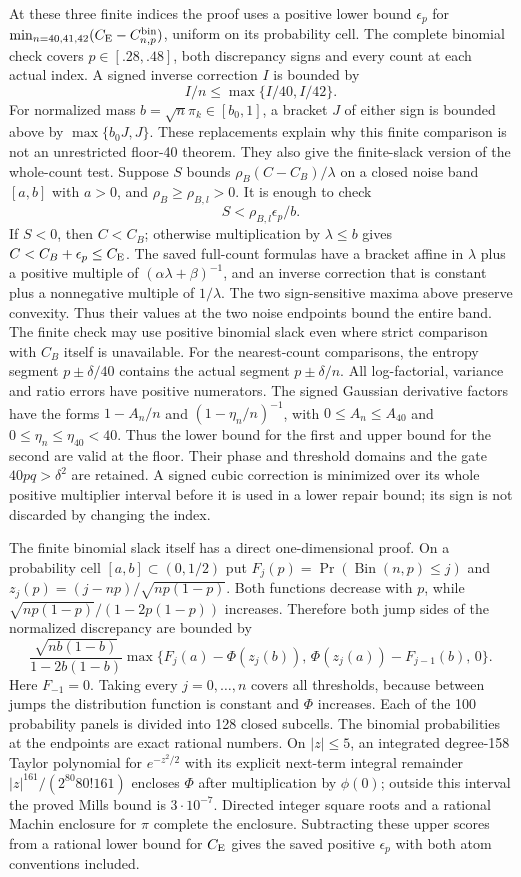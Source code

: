 At these three finite indices the proof uses a positive lower bound
$\epsilon_p$ for $\min_{n=40,41,42}(C_{\mathrm E}-C^{\rm bin}_{n,p})$,
uniform on its probability cell.
The complete binomial check covers $p\in[.28,.48]$, both discrepancy
signs and every count at each actual index. A signed inverse correction
$I$ is bounded by
\[
 I/n\le\max\{I/40,I/42\}.
\]
For normalized mass $b=\sqrt n\pi_k\in[b_0,1]$, a bracket $J$ of either sign is
bounded above by $\max\{b_0J,J\}$. These replacements explain why
this finite comparison is not an unrestricted floor-40 theorem.
They also give the finite-slack version of the whole-count test.
Suppose $S$ bounds $\rho_B(C-C_B)/\lambda$ on a closed noise
band $[a,b]$ with $a>0$, and $\rho_B\ge\rho_{B,l}>0$.
It is enough to check
\[
                  S<\rho_{B,l}\epsilon_p/b.
\]
If $S<0$, then $C<C_B$; otherwise multiplication by
$\lambda\le b$ gives $C<C_B+\epsilon_p\le C_{\mathrm E}$.
The saved full-count formulas have a bracket affine in $\lambda$
plus a positive multiple of $(\alpha\lambda+\beta)^{-1}$,
and an inverse correction that is constant plus a nonnegative
multiple of $1/\lambda$. The two sign-sensitive maxima above
preserve convexity. Thus their values at the two noise endpoints
bound the entire band. The finite check may use positive binomial
slack even where strict comparison with $C_B$ itself is unavailable.
For the nearest-count comparisons, the entropy segment
$p\pm\delta/40$ contains the actual segment $p\pm\delta/n$.
All log-factorial, variance and ratio errors have positive numerators.
The signed Gaussian derivative factors have the forms
$1-A_n/n$ and $(1-\eta_n/n)^{-1}$, with
$0\le A_n\le A_{40}$ and $0\le\eta_n\le\eta_{40}<40$.
Thus the lower bound for the first and upper bound for the second
are valid at the floor. Their phase and threshold domains and the
gate $40pq>\delta^2$ are retained. A signed cubic correction is
minimized over its whole positive multiplier interval before it is
used in a lower repair bound; its sign is not discarded by changing
the index.

The finite binomial slack itself has a direct one-dimensional proof.
On a probability cell $[a,b]\subset(0,1/2)$ put
$F_j(p)=\Pr(\operatorname{Bin}(n,p)\le j)$ and
$z_j(p)=(j-np)/\sqrt{np(1-p)}$. Both functions decrease with $p$,
while $\sqrt{np(1-p)}/(1-2p(1-p))$ increases. Therefore both jump
sides of the normalized discrepancy are bounded by
\[
 \frac{\sqrt{nb(1-b)}}{1-2b(1-b)}
 \max\{F_j(a)-\Phi(z_j(b)),\,
        \Phi(z_j(a))-F_{j-1}(b),\,0\}.
\]
Here $F_{-1}=0$. Taking every $j=0,\ldots,n$ covers all thresholds,
because between jumps the distribution function is constant and
$\Phi$ increases. Each of the 100 probability panels is divided
into 128 closed subcells. The binomial probabilities at the endpoints
are exact rational numbers. On $|z|\le5$, an integrated degree-158
Taylor polynomial for $e^{-z^2/2}$ with its explicit next-term
integral remainder $|z|^{161}/(2^{80}80!161)$ encloses $\Phi$
after multiplication by $\phi(0)$; outside this interval the proved Mills
bound is $3\cdot10^{-7}$. Directed integer square roots and a rational
Machin enclosure for $\pi$ complete the enclosure. Subtracting these
upper scores from a rational lower bound for $C_{\mathrm E}$ gives the saved
positive $\epsilon_p$ with both atom conventions included.

